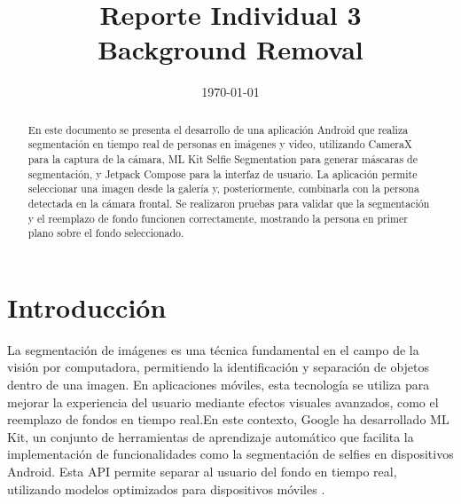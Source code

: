 \documentclass[conference]{IEEEtran}
\date{\specialdate\today}
\begin{document}
\newcommand{\breite}{0.9} %
\newcommand{\RelacionFiguradoscolumnas}{0.9}
\newcommand{\RelacionFiguradoscolumnasPuntoCinco}{0.45}



\title{Reporte Individual 3 \\Background Removal}

\author{
}
\maketitle



\begin{abstract} 

    En este documento se presenta el desarrollo de una aplicación Android que realiza segmentación en tiempo real de personas en imágenes y video, utilizando CameraX para la captura de la cámara, ML Kit Selfie Segmentation para generar máscaras de segmentación, y Jetpack Compose para la interfaz de usuario. La aplicación permite seleccionar una imagen desde la galería y, posteriormente, combinarla con la persona detectada en la cámara frontal. Se realizaron pruebas para validar que la segmentación y el reemplazo de fondo funcionen correctamente, mostrando la persona en primer plano sobre el fondo seleccionado.

\end{abstract}



\section{Introducción}

    La segmentación de imágenes es una técnica fundamental en el campo de la visión por computadora, permitiendo la identificación y separación de objetos dentro de una imagen. En aplicaciones móviles, esta tecnología se utiliza para mejorar la experiencia del usuario mediante efectos visuales avanzados, como el reemplazo de fondos en tiempo real.En este contexto, Google ha desarrollado ML Kit, un conjunto de herramientas de aprendizaje automático que facilita la implementación de funcionalidades como la segmentación de selfies en dispositivos Android. Esta API permite separar al usuario del fondo en tiempo real, utilizando modelos optimizados para dispositivos móviles \cite{mlkit_selfie_segmentation}.
\end{document}
